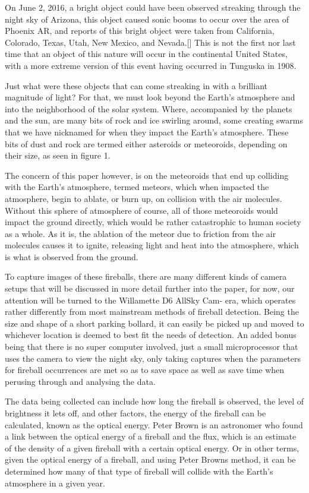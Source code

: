 

On June 2, 2016, a bright object could have been observed streaking through the night sky of Arizona, this object caused sonic booms to occur over the area of Phoenix AR, and reports of this bright object were taken from California, Colorado, Texas, Utah, New Mexico, and Nevada.[\cite{palotai2018analysis}] This is not the first nor last time that an object of this nature will occur in the continental United States, with a more extreme version of this event having occurred in Tunguska in 1908\cite{PBrown2002}.

Just what were these objects that can come streaking in with a brilliant magnitude of light? For that, we must look beyond the Earth's atmosphere and into the neighborhood of the solar system. Where, accompanied by the planets and the sun, are many bits of rock and ice swirling around, some creating swarms that we have nicknamed for when they impact the Earth's atmosphere. These bits of dust and rock are termed either asteroids or meteoroids, depending on their size, as seen in figure 1. 

The concern of this paper however, is on the meteoroids that end up colliding with the Earth's atmosphere, termed meteors, which when impacted the atmosphere, begin to ablate, or burn up, on collision with the air molecules. Without this sphere of atmosphere of course, all of those meteoroids would impact the ground directly, which would be rather catastrophic to human society as a whole. As it is, the ablation of the meteor due to friction from the air molecules causes it to ignite, releasing light and heat into the atmosphere, which is what is observed from the ground.

To capture images of these fireballs, there are many different kinds of camera setups that will be discussed in more detail further into the paper, for now, our attention will be turned to the Willamette D6 AllSky Cam-
era, which operates rather differently from most mainstream methods of fireball detection. Being the size and shape of a short parking bollard, it can easily be picked up and moved to whichever location is deemed to best fit the needs of detection. An added bonus being that there is no super computer involved, just a small microprocessor that uses the camera to view the night sky, only taking captures when the parameters for fireball occurrences are met so as to save space as well as save time when perusing through and analysing the data.

The data being collected can include how long the fireball is observed, the level of brightness it lets off, and other factors, the energy of the fireball can be calculated, known as the optical energy. Peter Brown is an astronomer who found a link between the optical energy of a fireball and the flux, which is an estimate of the density of a given fireball with a certain optical energy. Or in other terms, given the optical energy of a fireball, and using Peter Browns method, it can be determined how many of that type of fireball will collide with the Earth's atmosphere in a given year.

